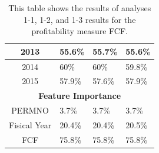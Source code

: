 {{\begin{table}[]
\begin{tabular}{clll}
\multicolumn{1}{|c|}{2013}                           & \multicolumn{1}{l|}{55.6\%}                      & \multicolumn{1}{l|}{55.7\%}                      & \multicolumn{1}{l|}{55.6\%}                        \\ \hline
\multicolumn{1}{|c|}{2014}                           & \multicolumn{1}{l|}{60\%}                        & \multicolumn{1}{l|}{60\%}                        & \multicolumn{1}{l|}{59.8\%}                        \\ \hline
\multicolumn{1}{|c|}{2015}                           & \multicolumn{1}{l|}{57.9\%}                      & \multicolumn{1}{l|}{57.6\%}                      & \multicolumn{1}{l|}{57.9\%}                        \\ \hline
\multicolumn{4}{|c|}{\textbf{Feature Importance}}                                                                                                                                                               \\ \hline
\multicolumn{1}{|c|}{PERMNO}                         & \multicolumn{1}{l|}{3.7\%}                       & \multicolumn{1}{l|}{3.7\%}                       & \multicolumn{1}{l|}{3.7\%}                         \\ \hline
\multicolumn{1}{|c|}{Fisical Year}                   & \multicolumn{1}{l|}{20.4\%}                      & \multicolumn{1}{l|}{20.4\%}                      & \multicolumn{1}{l|}{20.5\%}                        \\ \hline
\multicolumn{1}{|c|}{FCF}                            & \multicolumn{1}{l|}{75.8\%}                      & \multicolumn{1}{l|}{75.8\%}                      & \multicolumn{1}{l|}{75.8\%}                        \\ \hline
\end{tabular}
\caption{This table shows the results of analyses 1-1, 1-2, and 1-3 results for the profitability measure FCF.}
\label{tab:FCF-1}
\end{table}

}}
